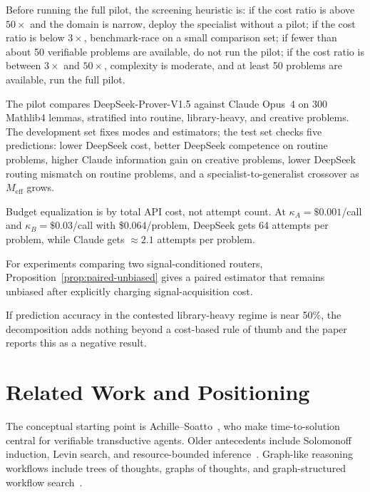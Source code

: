 \documentclass[10pt]{article}
\theoremstyle{paperplain}
\theoremstyle{paperdefinition}
\theoremstyle{paperremark}
\newcommand{\Meff}{M_{\mathrm{eff}}}
\begin{document}
Before running the full pilot, the screening heuristic is: if the cost ratio is above $50\times$ and the domain is narrow, deploy the specialist without a pilot; if the cost ratio is below $3\times$, benchmark-race on a small comparison set; if fewer than about 50 verifiable problems are available, do not run the pilot; if the cost ratio is between $3\times$ and $50\times$, complexity is moderate, and at least 50 problems are available, run the full pilot.

The pilot compares DeepSeek-Prover-V1.5 against Claude Opus~4 on 300 Mathlib4 lemmas, stratified into routine, library-heavy, and creative problems. The development set fixes modes and estimators; the test set checks five predictions: lower DeepSeek cost, better DeepSeek competence on routine problems, higher Claude information gain on creative problems, lower DeepSeek routing mismatch on routine problems, and a specialist-to-generalist crossover as $\Meff$ grows.

Budget equalization is by total API cost, not attempt count. At $\kappa_A=\$0.001$/call and $\kappa_B=\$0.03$/call with \$0.064/problem, DeepSeek gets 64 attempts per problem, while Claude gets $\approx 2.1$ attempts per problem.

For experiments comparing two signal-conditioned routers, Proposition~\ref{prop:paired-unbiased} gives a paired estimator that remains unbiased after explicitly charging signal-acquisition cost.

If prediction accuracy in the contested library-heavy regime is near 50\%, the decomposition adds nothing beyond a cost-based rule of thumb and the paper reports this as a negative result.

\section{Related Work and Positioning}
\label{sec:related}

The conceptual starting point is Achille--Soatto~\cite{achille2026}, who make time-to-solution central for verifiable transductive agents. Older antecedents include Solomonoff induction, Levin search, and resource-bounded inference~\cite{solomonoff1964,levin1973,livitanyi2008,levin_1984_randomness_conservation,schmidhuber_2002_speed_prior}. Graph-like reasoning workflows include trees of thoughts, graphs of thoughts, and graph-structured workflow search~\cite{yao_2023_tree_of_thoughts,besta_2023_graph_of_thoughts,zhang_2024_aflow}.
\end{document}
